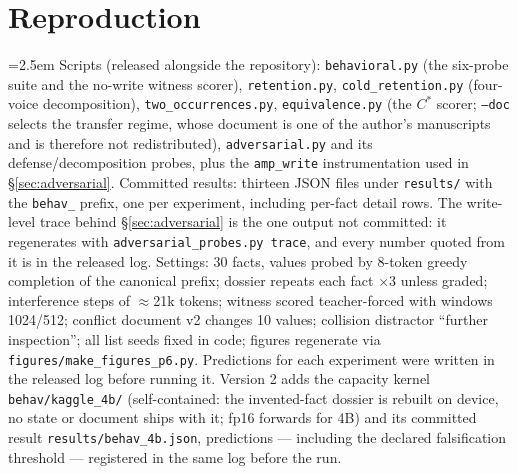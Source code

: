 \documentclass[11pt]{article}
\begin{document}
\appendix

\section{Reproduction}

\begingroup\emergencystretch=2.5em
Scripts (released alongside the repository): \texttt{behavioral.py} (the six-probe suite and the no-write witness scorer), \texttt{retention.py}, \texttt{cold\_retention.py} (four-voice decomposition), \texttt{two\_occurrences.py}, \texttt{equivalence.py} (the $C^{*}$ scorer; \texttt{--doc} selects the transfer regime, whose document is one of the author's manuscripts and is therefore not redistributed), \texttt{adversarial.py} and its defense/decomposition probes, plus the \texttt{amp\_write} instrumentation used in \S\ref{sec:adversarial}. Committed results: thirteen JSON files under \texttt{results/} with the \texttt{behav\_} prefix, one per experiment, including per-fact detail rows. The write-level trace behind \S\ref{sec:adversarial} is the one output not committed: it regenerates with \texttt{adversarial\_probes.py trace}, and every number quoted from it is in the released log. Settings: 30 facts, values probed by 8-token greedy completion of the canonical prefix; dossier repeats each fact $\times$3 unless graded; interference steps of $\approx$21k tokens; witness scored teacher-forced with windows 1024/512; conflict document v2 changes 10 values; collision distractor ``further inspection''; all list seeds fixed in code; figures regenerate via \texttt{figures/make\_figures\_p6.py}. Predictions for each experiment were written in the released log before running it. Version 2 adds the capacity kernel \texttt{behav/kaggle\_4b/} (self-contained: the invented-fact dossier is rebuilt on device, no state or document ships with it; fp16 forwards for 4B) and its committed result \texttt{results/behav\_4b.json}, predictions --- including the declared falsification threshold --- registered in the same log before the run.\par\endgroup
\end{document}
